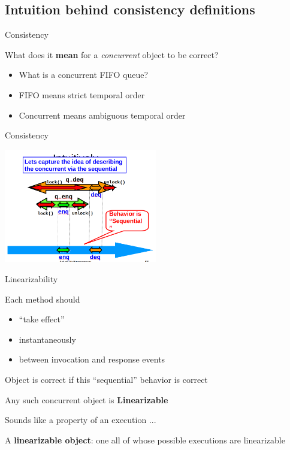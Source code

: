 \subsection{Intuition behind consistency definitions}
\showTOCSub

\begin{frame}{Consistency}

What does it \textbf{mean} for a \textit{concurrent} object to be correct?
\begin{itemize}
  \item What is a concurrent FIFO queue?
  \pause
  \item FIFO means strict temporal order
  \item Concurrent means ambiguous temporal order
\end{itemize}
\end{frame}

\begin{frame}{Consistency}
\begin{center}
  \includegraphics[width=0.5\textwidth]{./pics/conc-obj/seq-idea.png}
\end{center}
\end{frame}

\begin{frame}{Linearizability}

Each method should
\begin{itemize}
  \item “take effect”
  \item instantaneously
  \item between invocation and response events
\end{itemize}

\pause

Object is correct if this “sequential” behavior is correct

\pause
Any such concurrent object is \textbf{Linearizable}

\pause
Sounds like a property of an execution ...

\pause

A \textbf{linearizable object}: one all of whose possible executions are linearizable

\end{frame}


